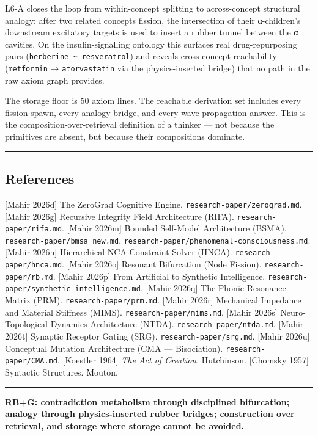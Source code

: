 \documentclass[
  11pt,
  a4paper,
]{article}
\begin{document}
L6-A closes the loop from within-concept splitting to across-concept
structural analogy: after two related concepts fission, the intersection
of their α-children's downstream excitatory targets is used to insert a
rubber tunnel between the α cavities. On the insulin-signalling ontology
this surfaces real drug-repurposing pairs
(\texttt{berberine\ \textasciitilde{}\ resveratrol}) and reveals
cross-concept reachability (\texttt{metformin} → \texttt{atorvastatin}
via the physics-inserted bridge) that no path in the raw axiom graph
provides.

The storage floor is 50 axiom lines. The reachable derivation set
includes every fission spawn, every analogy bridge, and every
wave-propagation answer. This is the composition-over-retrieval
definition of a thinker --- not because the primitives are absent, but
because their compositions dominate.

\begin{center}\rule{0.5\linewidth}{0.5pt}\end{center}

\subsection{References}\label{references}

{[}Mahir 2026d{]} The ZeroGrad Cognitive Engine.
\texttt{research-paper/zerograd.md}. {[}Mahir 2026g{]} Recursive
Integrity Field Architecture (RIFA). \texttt{research-paper/rifa.md}.
{[}Mahir 2026m{]} Bounded Self-Model Architecture (BSMA).
\texttt{research-paper/bmsa\_new.md},
\texttt{research-paper/phenomenal-consciousness.md}. {[}Mahir 2026n{]}
Hierarchical NCA Constraint Solver (HNCA).
\texttt{research-paper/hnca.md}. {[}Mahir 2026o{]} Resonant Bifurcation
(Node Fission). \texttt{research-paper/rb.md}. {[}Mahir 2026p{]} From
Artificial to Synthetic Intelligence.
\texttt{research-paper/synthetic-intelligence.md}. {[}Mahir 2026q{]} The
Phonic Resonance Matrix (PRM). \texttt{research-paper/prm.md}. {[}Mahir
2026r{]} Mechanical Impedance and Material Stiffness (MIMS).
\texttt{research-paper/mims.md}. {[}Mahir 2026s{]} Neuro-Topological
Dynamics Architecture (NTDA). \texttt{research-paper/ntda.md}. {[}Mahir
2026t{]} Synaptic Receptor Gating (SRG). \texttt{research-paper/srg.md}.
{[}Mahir 2026u{]} Conceptual Mutation Architecture (CMA ---
Bisociation). \texttt{research-paper/CMA.md}. {[}Koestler 1964{]}
\emph{The Act of Creation}. Hutchinson. {[}Chomsky 1957{]} Syntactic
Structures. Mouton.

\begin{center}\rule{0.5\linewidth}{0.5pt}\end{center}

\textbf{RB+G: contradiction metabolism through disciplined bifurcation;
analogy through physics-inserted rubber bridges; construction over
retrieval, and storage where storage cannot be avoided.}
\end{document}
